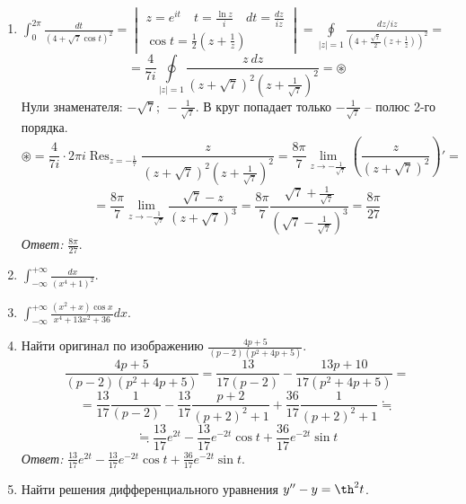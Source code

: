 \documentclass[14pt, a4paper, titlepage, fleqn]{extarticle}
\DeclareMathOperator*{\res}{Res}
\begin{document}
\begin{enumerate}
            \item \(
                 \int_{0}^{2\pi} \frac{dt}{(4+\sqrt{7} \cos t)^2 } = \begin{vmatrix}
                    z = e^{it} \quad t = \frac{\ln z}{i} \quad dt = \frac{dz}{iz} \\
                    \cos t = \frac{1}{2} \left( z + \frac{1}{z} \right)
                \end{vmatrix} = \oint\limits_{|z|=1} \frac{dz/iz}{\left( 4 + \frac{\sqrt{7}}{2} \left( z + \frac{1}{z} \right) \right)^2} =
            \)
            \[
                = \frac{4}{7i} \oint\limits_{|z|=1} \frac{z ~ dz}{ (z+\sqrt{7})^2 \left( z + \frac{1}{\sqrt{7}} \right)^2} = \circledast
            \]
            Нули знаменателя: \( -\sqrt{7}; ~ -\frac{1}{\sqrt{7}} \). В круг попадает только \( -\frac{1}{\sqrt{7}} \) -- полюс 2-го порядка.
            \[
                \circledast = \frac{4}{7i} \cdot 2\pi i \res_{z = -\frac{1}{7}} \frac{z}{ (z+\sqrt{7})^2 \left( z + \frac{1}{\sqrt{7}} \right)^2} = \frac{8\pi}{7} \lim_{z\to -\frac{1}{\sqrt{7}}} \left( \frac{z}{(z+\sqrt{7})^2} \right)' =
            \]
            \[
                = \frac{8\pi}{7} \lim_{z\to -\frac{1}{\sqrt{7}}} \frac{\sqrt{7} - z}{\left( z+\sqrt{7} \right)^3} = \frac{8\pi}{7} \frac{\sqrt{7} + \frac{1}{\sqrt{7}}}{(\sqrt{7} - \frac{1}{\sqrt{7}})^3} = \frac{8\pi}{27}
            \]
            \textit{Ответ:} \( \frac{8\pi}{27} \).

            \item \( \int_{-\infty}^{+\infty} \frac{dx}{(x^4+1)^2} \).

            \item \( \int_{-\infty}^{+\infty} \frac{(x^2+x) \cos x}{x^4+13x^2+36} dx \).
            
            \item Найти оригинал по изображению \( \frac{4p+5}{(p-2)(p^2+4p+5)} \).
            \[
                \frac{4p+5}{(p-2)(p^2+4p+5)} = \frac{13}{17(p-2)} - \frac{13p+10}{17(p^2+4p+5)} = 
            \]
            \[
                = \frac{13}{17} \frac{1}{(p-2)} - \frac{13}{17} \frac{p+2}{(p+2)^2 + 1} + \frac{36}{17}\frac{1}{(p+2)^2 + 1} \fallingdotseq
            \]
            \[
                \fallingdotseq \frac{13}{17} e^{2t} - \frac{13}{17} e^{-2t} \cos t + \frac{36}{17} e^{-2t} \sin t
            \]
            \textit{Ответ:} \( \frac{13}{17} e^{2t} - \frac{13}{17} e^{-2t} \cos t + \frac{36}{17} e^{-2t} \sin t \).

            \item Найти решения дифференциального уравнения \( y'' - y = \th^2 t \).
            

\end{enumerate}
\end{document}
